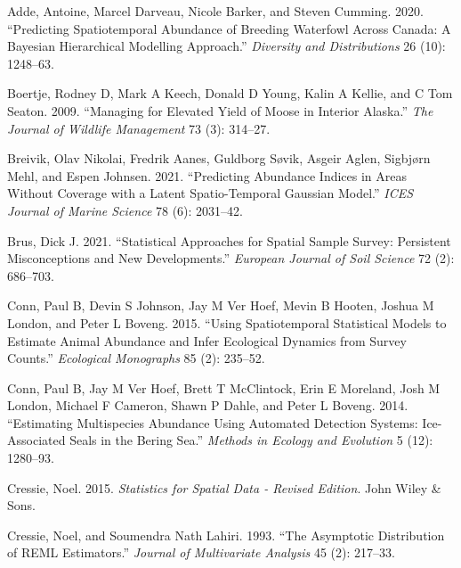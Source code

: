 \documentclass[smallextended]{svjour3}       %
\newlength{\cslhangindent}
\newlength{\cslentryspacingunit} %
\newenvironment{CSLReferences}[2] %
 {%
  \setlength{\parindent}{0pt}
  \ifodd #1
  \let\oldpar\par
  \def\par{\hangindent=\cslhangindent\oldpar}
  \fi
  \setlength{\parskip}{#2\cslentryspacingunit}
 }%
 {}
\begin{document}
\hypertarget{refs}{}
\begin{CSLReferences}{1}{0}
\leavevmode{}%
Adde, Antoine, Marcel Darveau, Nicole Barker, and Steven Cumming. 2020.
{``Predicting Spatiotemporal Abundance of Breeding Waterfowl Across
Canada: A Bayesian Hierarchical Modelling Approach.''} \emph{Diversity
and Distributions} 26 (10): 1248--63.

\leavevmode{}%
Boertje, Rodney D, Mark A Keech, Donald D Young, Kalin A Kellie, and C
Tom Seaton. 2009. {``Managing for Elevated Yield of Moose in Interior
Alaska.''} \emph{The Journal of Wildlife Management} 73 (3): 314--27.

\leavevmode{}%
Breivik, Olav Nikolai, Fredrik Aanes, Guldborg Søvik, Asgeir Aglen,
Sigbjørn Mehl, and Espen Johnsen. 2021. {``Predicting Abundance Indices
in Areas Without Coverage with a Latent Spatio-Temporal Gaussian
Model.''} \emph{ICES Journal of Marine Science} 78 (6): 2031--42.

\leavevmode{}%
Brus, Dick J. 2021. {``Statistical Approaches for Spatial Sample Survey:
Persistent Misconceptions and New Developments.''} \emph{European
Journal of Soil Science} 72 (2): 686--703.

\leavevmode{}%
Conn, Paul B, Devin S Johnson, Jay M Ver Hoef, Mevin B Hooten, Joshua M
London, and Peter L Boveng. 2015. {``Using Spatiotemporal Statistical
Models to Estimate Animal Abundance and Infer Ecological Dynamics from
Survey Counts.''} \emph{Ecological Monographs} 85 (2): 235--52.

\leavevmode{}%
Conn, Paul B, Jay M Ver Hoef, Brett T McClintock, Erin E Moreland, Josh
M London, Michael F Cameron, Shawn P Dahle, and Peter L Boveng. 2014.
{``Estimating Multispecies Abundance Using Automated Detection Systems:
Ice-Associated Seals in the Bering Sea.''} \emph{Methods in Ecology and
Evolution} 5 (12): 1280--93.

\leavevmode{}%
Cressie, Noel. 2015. \emph{Statistics for Spatial Data - Revised
Edition}. John Wiley \& Sons.

\leavevmode{}%
Cressie, Noel, and Soumendra Nath Lahiri. 1993. {``The Asymptotic
Distribution of REML Estimators.''} \emph{Journal of Multivariate
Analysis} 45 (2): 217--33.


\end{CSLReferences}
\end{document}
